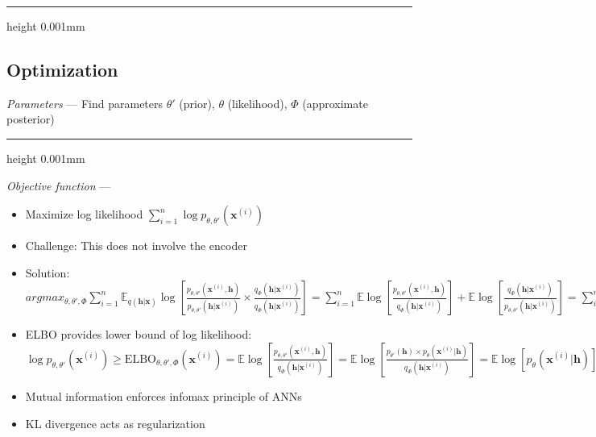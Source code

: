 {\color{black}\hrule height 0.001mm}

\subsection*{Optimization}
\emph{Parameters} --- Find parameters $\theta'$ (prior), $\theta$ (likelihood), $\Phi$ (approximate posterior) 

{\color{lightgray}\hrule height 0.001mm}

\emph{Objective function} --- 
\begin{itemize}
    \item Maximize log likelihood $\sum_{i=1}^n \log p_{\theta,\theta'}(\boldsymbol{x}^{(i)})$
    \item Challenge: This does not involve the encoder
    \item Solution: $argmax_{\theta,\theta',\Phi} \sum_{i=1}^n \mathbb{E}_{ q(\boldsymbol{h|x})} \log [ \frac{p_{\theta,\theta'}(\boldsymbol{x}^{(i)}, \boldsymbol{h})}{p_{\theta,\theta'}(\boldsymbol{h} | \boldsymbol{x}^{(i)})} \times \frac{q_\Phi(\boldsymbol{h}|\boldsymbol{x}^{(i)})}{q_\Phi(\boldsymbol{h}|\boldsymbol{x}^{(i)})} ] = 
    \sum_{i=1}^n \mathbb{E} \log [ \frac{p_{\theta,\theta'}(\boldsymbol{x}^{(i)}, \boldsymbol{h})}{q_\Phi(\boldsymbol{h}|\boldsymbol{x}^{(i)})}] + \mathbb{E} \log [\frac{q_\Phi(\boldsymbol{h}|\boldsymbol{x}^{(i)})}{p_{\theta,\theta'}(\boldsymbol{h} | \boldsymbol{x}^{(i)})}]
    = \sum_{i=1}^n \textrm{ELBO}_{\theta,\theta',\Phi}(\boldsymbol{x}^{(i)}) + \textrm{KL divergence}(q_\Phi(\cdot | \boldsymbol{x}^{(i)}) | p_{\theta,\theta'}(\cdot |\boldsymbol{x}^{(i)}))
    $
    \item ELBO provides lower bound of log likelihood: $\log p_{\theta,\theta'}(\boldsymbol{x}^{(i)}) \geq \textrm{ELBO}_{\theta,\theta',\Phi}(\boldsymbol{x}^{(i)}) 
    =
    \mathbb{E} \log [ \frac{p_{\theta,\theta'}(\boldsymbol{x}^{(i)}, \boldsymbol{h})}{q_\Phi(\boldsymbol{h}|\boldsymbol{x}^{(i)})}]
    = 
    \mathbb{E} \log [ \frac{p_{\theta'}(\boldsymbol{h}) \times p_{\theta}(\boldsymbol{x}^{(i)} | \boldsymbol{h})}{q_\Phi(\boldsymbol{h}|\boldsymbol{x}^{(i)})}]
    = 
    \mathbb{E} \log [ p_{\theta}(\boldsymbol{x}^{(i)} | \boldsymbol{h}) ] + \mathbb{E} \log [ \frac{p_{\theta'}(\boldsymbol{h})}{q_\Phi(\boldsymbol{h}|\boldsymbol{x}^{(i)})}]
    =
    \textrm{mutual information resp. cross-entropy from decoder } - \textrm{ KL divergence } (q_\Phi(\cdot | \boldsymbol{x}^{(i)}) | p_{\theta'}(\cdot)) \textrm{ from encoder} 
    $
    \item Mutual information enforces infomax principle of ANNs
    \item KL divergence acts as regularization
\end{itemize}